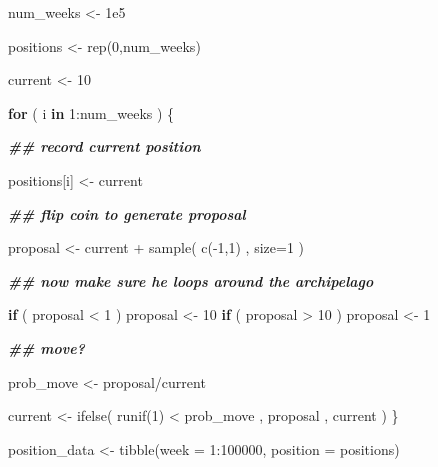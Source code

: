 \documentclass[
]{book}
\newenvironment{Shaded}{\begin{snugshade}}{\end{snugshade}}
\newcommand{\AttributeTok}[1]{\textcolor[rgb]{0.77,0.63,0.00}{#1}}
\newcommand{\ControlFlowTok}[1]{\textcolor[rgb]{0.13,0.29,0.53}{\textbf{#1}}}
\newcommand{\DecValTok}[1]{\textcolor[rgb]{0.00,0.00,0.81}{#1}}
\newcommand{\DocumentationTok}[1]{\textcolor[rgb]{0.56,0.35,0.01}{\textbf{\textit{#1}}}}
\newcommand{\FloatTok}[1]{\textcolor[rgb]{0.00,0.00,0.81}{#1}}
\newcommand{\FunctionTok}[1]{\textcolor[rgb]{0.00,0.00,0.00}{#1}}
\newcommand{\NormalTok}[1]{#1}
\newcommand{\OtherTok}[1]{\textcolor[rgb]{0.56,0.35,0.01}{#1}}
\newcommand{\SpecialCharTok}[1]{\textcolor[rgb]{0.00,0.00,0.00}{#1}}
\begin{document}
\begin{Shaded}
\begin{Highlighting}[]
\NormalTok{num\_weeks }\OtherTok{\textless{}{-}} \FloatTok{1e5} 

\NormalTok{positions }\OtherTok{\textless{}{-}} \FunctionTok{rep}\NormalTok{(}\DecValTok{0}\NormalTok{,num\_weeks) }

\NormalTok{current }\OtherTok{\textless{}{-}} \DecValTok{10} 

\ControlFlowTok{for}\NormalTok{ ( i }\ControlFlowTok{in} \DecValTok{1}\SpecialCharTok{:}\NormalTok{num\_weeks ) \{ }
  
  \DocumentationTok{\#\# record current position }
  
\NormalTok{  positions[i] }\OtherTok{\textless{}{-}}\NormalTok{ current}
  
  \DocumentationTok{\#\# flip coin to generate proposal }
  
\NormalTok{  proposal }\OtherTok{\textless{}{-}}\NormalTok{ current }\SpecialCharTok{+} \FunctionTok{sample}\NormalTok{( }\FunctionTok{c}\NormalTok{(}\SpecialCharTok{{-}}\DecValTok{1}\NormalTok{,}\DecValTok{1}\NormalTok{) , }\AttributeTok{size=}\DecValTok{1}\NormalTok{ )}
  
  \DocumentationTok{\#\# now make sure he loops around the archipelago }
  
  \ControlFlowTok{if}\NormalTok{ ( proposal }\SpecialCharTok{\textless{}} \DecValTok{1}\NormalTok{ ) proposal }\OtherTok{\textless{}{-}} \DecValTok{10} 
  \ControlFlowTok{if}\NormalTok{ ( proposal }\SpecialCharTok{\textgreater{}} \DecValTok{10}\NormalTok{ ) proposal }\OtherTok{\textless{}{-}} \DecValTok{1}

  \DocumentationTok{\#\# move?}

\NormalTok{  prob\_move }\OtherTok{\textless{}{-}}\NormalTok{ proposal}\SpecialCharTok{/}\NormalTok{current }

\NormalTok{  current }\OtherTok{\textless{}{-}} \FunctionTok{ifelse}\NormalTok{( }\FunctionTok{runif}\NormalTok{(}\DecValTok{1}\NormalTok{) }\SpecialCharTok{\textless{}}\NormalTok{ prob\_move , proposal , current )}
\NormalTok{\}}

\NormalTok{position\_data }\OtherTok{\textless{}{-}} \FunctionTok{tibble}\NormalTok{(}\AttributeTok{week =} \DecValTok{1}\SpecialCharTok{:}\DecValTok{100000}\NormalTok{, }\AttributeTok{position =}\NormalTok{ positions)}
\end{Highlighting}
\end{Shaded}
\end{document}
